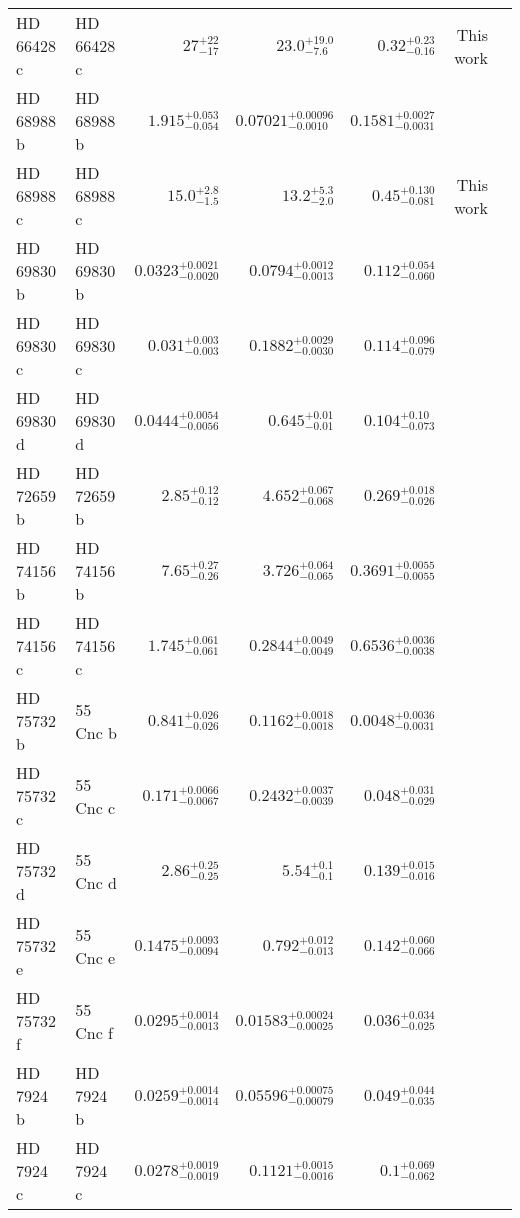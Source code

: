 \begin{longtable*}{llrrrrr}
HD 66428 c & HD 66428 c & $27^{+22}_{-17}$ & $23.0^{+19.0}_{-7.6}$ & $0.32^{+0.23}_{-0.16}$ & This work & \\
HD 68988 b & HD 68988 b & $1.915^{+0.053}_{-0.054}$ & $0.07021^{+0.00096}_{-0.0010}$ & $0.1581^{+0.0027}_{-0.0031}$ & \cite{Vogt02} & \\
HD 68988 c & HD 68988 c & $15.0^{+2.8}_{-1.5}$ & $13.2^{+5.3}_{-2.0}$ & $0.45^{+0.130}_{-0.081}$ & This work & \\
HD 69830 b & HD 69830 b & $0.0323^{+0.0021}_{-0.0020}$ & $0.0794^{+0.0012}_{-0.0013}$ & $0.112^{+0.054}_{-0.060}$ & \cite{Lovis06} & \\
HD 69830 c & HD 69830 c & $0.031^{+0.003}_{-0.003}$ & $0.1882^{+0.0029}_{-0.0030}$ & $0.114^{+0.096}_{-0.079}$ & \cite{Lovis06} & \\
HD 69830 d & HD 69830 d & $0.0444^{+0.0054}_{-0.0056}$ & $0.645^{+0.01}_{-0.01}$ & $0.104^{+0.10}_{-0.073}$ & \cite{Lovis06} & \\
HD 72659 b & HD 72659 b & $2.85^{+0.12}_{-0.12}$ & $4.652^{+0.067}_{-0.068}$ & $0.269^{+0.018}_{-0.026}$ & \cite{Butler03} & \\
HD 74156 b & HD 74156 b & $7.65^{+0.27}_{-0.26}$ & $3.726^{+0.064}_{-0.065}$ & $0.3691^{+0.0055}_{-0.0055}$ & \cite{Naef04} & \\
HD 74156 c & HD 74156 c & $1.745^{+0.061}_{-0.061}$ & $0.2844^{+0.0049}_{-0.0049}$ & $0.6536^{+0.0036}_{-0.0038}$ & \cite{Naef04} & \\
HD 75732 b & 55 Cnc b & $0.841^{+0.026}_{-0.026}$ & $0.1162^{+0.0018}_{-0.0018}$ & $0.0048^{+0.0036}_{-0.0031}$ & \cite{Butler97} & \\
HD 75732 c & 55 Cnc c & $0.171^{+0.0066}_{-0.0067}$ & $0.2432^{+0.0037}_{-0.0039}$ & $0.048^{+0.031}_{-0.029}$ & \cite{McArthur04} & \\
HD 75732 d & 55 Cnc d & $2.86^{+0.25}_{-0.25}$ & $5.54^{+0.1}_{-0.1}$ & $0.139^{+0.015}_{-0.016}$ & \cite{Marcy02} & \\
HD 75732 e & 55 Cnc e & $0.1475^{+0.0093}_{-0.0094}$ & $0.792^{+0.012}_{-0.013}$ & $0.142^{+0.060}_{-0.066}$ & \cite{McArthur04} & \\
HD 75732 f & 55 Cnc f & $0.0295^{+0.0014}_{-0.0013}$ & $0.01583^{+0.00024}_{-0.00025}$ & $0.036^{+0.034}_{-0.025}$ & \cite{Fischer08} & \\
HD 7924 b & HD 7924 b & $0.0259^{+0.0014}_{-0.0014}$ & $0.05596^{+0.00075}_{-0.00079}$ & $0.049^{+0.044}_{-0.035}$ & \cite{Fulton15} & \\
HD 7924 c & HD 7924 c & $0.0278^{+0.0019}_{-0.0019}$ & $0.1121^{+0.0015}_{-0.0016}$ & $0.1^{+0.069}_{-0.062}$ & \cite{Fulton15} & \\

\end{longtable*}
